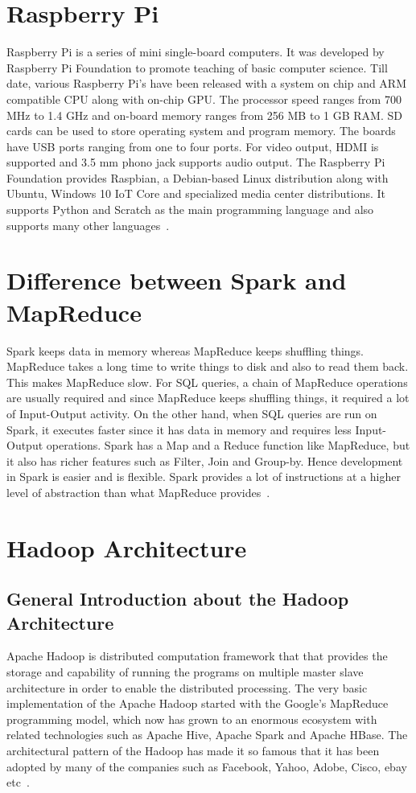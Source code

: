 \section{Raspberry Pi}

Raspberry Pi is a series of mini single-board computers. 
It was developed by Raspberry Pi Foundation to promote teaching of basic 
computer science. Till date, various Raspberry Pi's have been released with a 
system on chip and ARM compatible CPU along with on-chip GPU.   The processor 
speed ranges from 700 MHz to 1.4 GHz and on-board memory ranges from 256 MB to 
1 GB RAM. SD cards can be used to store operating system and program memory. The
boards have USB ports ranging from one to four ports. For video output, HDMI is 
supported and 3.5 mm phono jack supports audio output. The Raspberry Pi 
Foundation provides Raspbian, a Debian-based Linux distribution along with 
Ubuntu, Windows 10 IoT Core and specialized media center distributions. It 
supports Python and Scratch as the main programming language and also supports 
many other languages~\cite{hid-sp18-408-Raspberry-Pi}.

\section{Difference between Spark and MapReduce}

Spark keeps data in memory whereas MapReduce keeps shuffling things. MapReduce 
takes a long time to write things to disk and also to read them back. This makes
MapReduce slow. For SQL queries, a chain of MapReduce operations are usually 
required and since MapReduce keeps shuffling things, it required a lot of 
Input-Output activity. On the other hand, when SQL queries are run on Spark, it 
executes faster since it has data in memory and requires less Input-Output 
operations. Spark has a Map and a Reduce function like MapReduce, but it also 
has richer features such as Filter, Join and Group-by. Hence development in 
Spark is easier and is flexible. Spark provides a lot of instructions at a 
higher level of abstraction than what MapReduce provides~\cite{hid-sp18-408-Difference}.

\section{Hadoop Architecture}

\subsection{General Introduction about the Hadoop Architecture}
Apache Hadoop is distributed computation framework that that provides 
the storage and capability of running the programs on multiple 
master slave architecture in order to enable the distributed processing. 
The very basic implementation of the Apache Hadoop started with the 
Google’s MapReduce programming model, which now has grown to an 
enormous ecosystem with related technologies such as Apache Hive, 
Apache Spark and Apache HBase. The architectural pattern of the Hadoop 
has made it so famous that it has been adopted by many of the companies 
such as Facebook, Yahoo, Adobe, 
Cisco, ebay etc~\cite{hid-sp18-412-hadoop-architecture-overview}.


